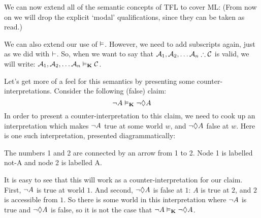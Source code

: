 We can now extend all of the semantic concepts of TFL to cover ML:
(From now on we will drop the explicit `modal' qualifications, since they can be taken as read.)

We can also extend our use of $\vDash$. However, we need to add subscripts again, just as we did with $\vdash$. So, when we want to say that $\metav{A}_1,\metav{A}_2, \dots \metav{A}_n\therefore\metav{C}$ is valid, we will write: $\mathcal{A}_1,\mathcal{A}_2, \dots \mathcal{A}_n\vDash_{\mathbf{K}}\mathcal{C}$.

Let's get more of a feel for this semantics by presenting some counter-interpretations. Consider the following (false) claim:
\[\neg A\vDash_{\mathbf{K}} \neg \Diamond A\]
In order to present a counter-interpretation to this claim, we need to cook up an interpretation which makes $\neg A$ true at some world $w$, and $\neg\Diamond A$ false at $w$. Here is one such interpretation, presented diagrammatically:
\begin{center}
\begin{arialabel}{The numbers 1 and 2 are connected by an arrow from 1 to 2. Node 1 is labelled not-A and node 2 is labelled A.}
\end{arialabel}
\end{center}
It is easy to see that this will work as a counter-interpretation for our claim. First, $\neg A$ is true at world $1$. And second, $\neg\Diamond A$ is false at $1$: $A$ is true at $2$, and $2$ is accessible from $1$. So there is some world in this interpretation where $\neg A$ is true and $\neg\Diamond A$ is false, so it is not the case that $\neg A\vDash_{\mathbf{K}}\neg\Diamond A$.

